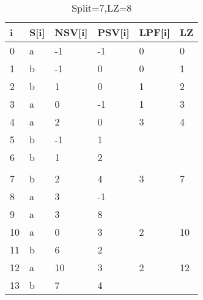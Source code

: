 \begin{table}[h]
\begin{tabular}{@{}llllll@{}}
\toprule
i  & S{[}i{]} & NSV{[}i{]} & PSV{[}i{]} & LPF{[}i{]} & LZ \\ \midrule
0  & a        & -1         & -1         & 0          & 0  \\
1  & b        & -1         & 0          & 0          & 1  \\
2  & b        & 1          & 0          & 1          & 2  \\
3  & a        & 0          & -1         & 1          & 3  \\
4  & a        & 2          & 0          & 3          & 4  \\
5  & b        & -1         & 1          &            &    \\
6  & b        & 1          & 2          &            &    \\
   &          &            &            &            &    \\
7  & b        & 2          & 4          & 3          & 7  \\
8  & a        & 3          & -1         &            &    \\
9  & a        & 3          & 8          &            &    \\
10 & a        & 0          & 3          & 2          & 10 \\
11 & b        & 6          & 2          &            &    \\
12 & a        & 10         & 3          & 2          & 12 \\
13 & b        & 7          & 4          &            &    \\ \bottomrule
\end{tabular}
\caption{Split=7,LZ=8}
\label{table:example7}
\end{table}

